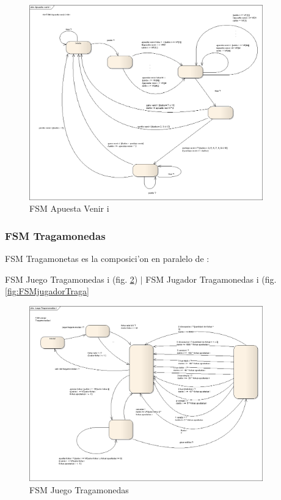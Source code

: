         \begin{figure}[p!hbt]
		\centering
		\includegraphics[angle=90, width=0.9\textwidth]{../img/FSM_ApuestaVenir.png}
		\caption{FSM Apuesta Venir i }
		\label{fig:FSM_ApuestaVenir}
	\end{figure}



\subsubsection{FSM Tragamonedas}

FSM Tragamonetas es la composici'on en paralelo de : 

FSM Juego Tragamonedas i (fig. \ref{fig: FSMtraga}) $|$
FSM Jugador Tragamonedas i (fig. \ref{fig:FSMjugadorTraga} 


        \begin{figure}[p!hbt]
		\centering
		\includegraphics[angle=90, width=0.9\textwidth]{../img/FSM_JuegoTragamonedas.png}
		\caption{FSM Juego Tragamonedas }
		\label{fig: FSMtraga}
	\end{figure}

